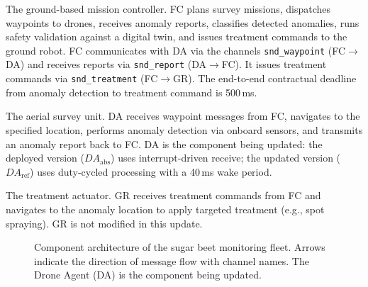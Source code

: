 \documentclass[11pt,a4paper]{article}
\newcommand{\DAabs}{\mathit{DA}_{\mathrm{abs}}}
\newcommand{\DAref}{\mathit{DA}_{\mathrm{ref}}}
\begin{document}
\begin{description}[nosep,leftmargin=1.5em]
  \item[Fleet Coordinator (FC)]
    The ground-based mission controller.  FC plans survey missions, dispatches
    waypoints to drones, receives anomaly reports, classifies detected
    anomalies, runs safety validation against a digital twin, and issues
    treatment commands to the ground robot.  FC communicates with DA via the
    channels \texttt{snd\_waypoint} (FC$\to$DA) and receives reports via
    \texttt{snd\_report} (DA$\to$FC).  It issues treatment commands via
    \texttt{snd\_treatment} (FC$\to$GR).  The end-to-end contractual deadline
    from anomaly detection to treatment command is 500\,ms.

  \item[Drone Agent (DA)]
    The aerial survey unit.  DA receives waypoint messages from FC, navigates
    to the specified location, performs anomaly detection via onboard sensors,
    and transmits an anomaly report back to FC.  DA is the component being
    updated: the deployed version ($\DAabs$) uses interrupt-driven receive; the
    updated version ($\DAref$) uses duty-cycled processing with a 40\,ms wake
    period.

  \item[Ground Robot (GR)]
    The treatment actuator.  GR receives treatment commands from FC and
    navigates to the anomaly location to apply targeted treatment (e.g.,
    spot spraying).  GR is not modified in this update.
\end{description}

\begin{figure}[ht]
\centering
{}
\caption{Component architecture of the sugar beet monitoring fleet.  Arrows
  indicate the direction of message flow with channel names.  The Drone Agent
  (DA) is the component being updated.}
\label{fig:architecture}
\end{figure}
\end{document}
